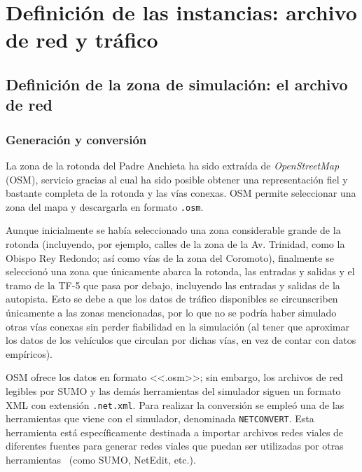 \chapter{Definición de las instancias: archivo de red y tráfico}
\label{cap:instancias}

\section{Definición de la zona de simulación: el archivo de red}
\label{def_zona_sim_archivo_red}

\subsection{Generación y conversión}
\label{gen_conv}

La zona de la rotonda del Padre Anchieta ha sido extraída de \textit{OpenStreetMap} (OSM), servicio gracias al cual ha sido posible obtener una representación fiel y bastante completa de la rotonda y las vías conexas. OSM permite seleccionar una zona del mapa y descargarla en formato \texttt{.osm}.

Aunque inicialmente se había seleccionado una zona considerable grande de la rotonda (incluyendo, por ejemplo, calles de la zona de la Av. Trinidad, como la Obispo Rey Redondo; así como vías de la zona del Coromoto), finalmente se seleccionó una zona que únicamente abarca la rotonda, las entradas y salidas y el tramo de la TF-5 que pasa por debajo, incluyendo las entradas y salidas de la autopista. Esto se debe a que los datos de tráfico disponibles se circunscriben únicamente a las zonas mencionadas, por lo que no se podría haber simulado otras vías conexas sin perder fiabilidad en la simulación (al tener que aproximar los datos de los vehículos que circulan por dichas vías, en vez de contar con datos empíricos).

OSM ofrece los datos en formato <<.osm>>; sin embargo, los archivos de red legibles por SUMO y las demás herramientas del simulador siguen un formato XML con extensión \texttt{.net.xml}. Para realizar la conversión se empleó una de las herramientas que viene con el simulador, denominada \texttt{NETCONVERT}. Esta herramienta está específicamente destinada a importar archivos redes viales de diferentes fuentes para generar redes viales que puedan ser utilizadas por otras herramientas~\cite{noauthor_netconvert_nodate} (como SUMO, NetEdit, etc.).


